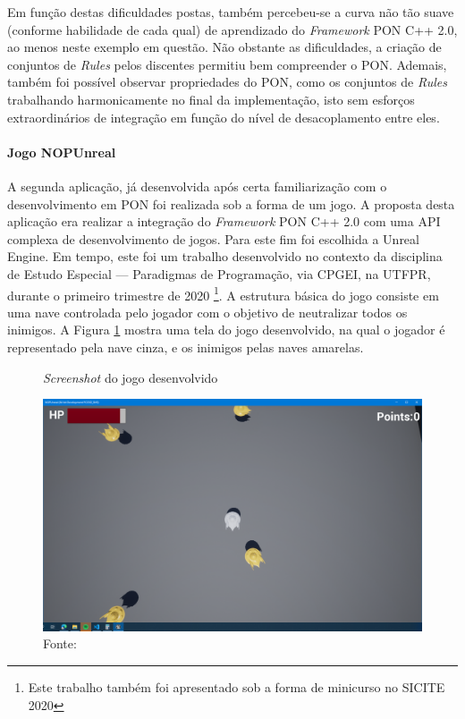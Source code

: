 Em função destas dificuldades postas, também percebeu-se a curva não tão suave
(conforme habilidade de cada qual) de aprendizado do \textit{Framework} PON C++
2.0, ao menos neste exemplo em questão. Não obstante as dificuldades, a criação
de conjuntos de \textit{Rules} pelos discentes permitiu bem compreender o PON.
Ademais, também foi possível observar propriedades do PON, como os conjuntos de
\textit{Rules} trabalhando harmonicamente no final da implementação, isto sem
esforços extraordinários de integração em função do nível de desacoplamento
entre eles.

\paragraph{Jogo NOPUnreal}\label{sec:nopunreal}

A segunda aplicação, já desenvolvida após certa familiarização com o
desenvolvimento em PON foi realizada sob a forma de um jogo. A proposta desta
aplicação era realizar a integração do \textit{Framework} PON C++ 2.0 com uma
API complexa de desenvolvimento de jogos. Para este fim foi escolhida a Unreal
Engine. Em tempo, este foi um trabalho desenvolvido no contexto da disciplina de
Estudo Especial — Paradigmas de Programação, via CPGEI, na UTFPR, durante o
primeiro trimestre de 2020 \cite{neves_2020}\footnote{Este trabalho também foi
apresentado sob a forma de minicurso no SICITE 2020}. A estrutura básica do jogo
consiste em uma nave controlada pelo jogador com o objetivo de neutralizar todos
os inimigos. A Figura \ref{fig:jogo_fw2} mostra uma tela do jogo desenvolvido,
na qual o jogador é representado pela nave cinza, e os inimigos pelas naves
amarelas.

\begin{figure}[!htb]
  \centering
  \caption{\textit{Screenshot} do jogo desenvolvido} \includegraphics[width=\textwidth]{../figures/game.png}
  \smallskip
  \caption*{Fonte:
      }
  \label{fig:jogo_fw2}
\end{figure}

